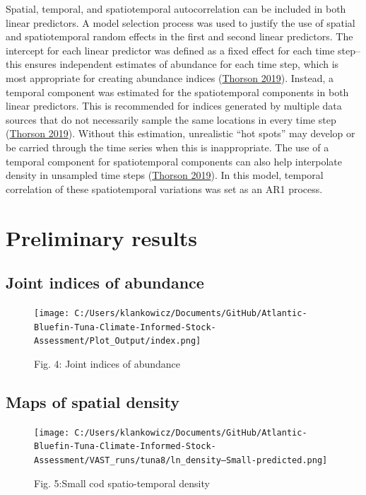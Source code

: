 \documentclass[
]{article}
\begin{document}
Spatial, temporal, and spatiotemporal autocorrelation can be included in both linear predictors. A model selection process was used to justify the use of spatial and spatiotemporal random effects in the first and second linear predictors. The intercept for each linear predictor was defined as a fixed effect for each time step-- this ensures independent estimates of abundance for each time step, which is most appropriate for creating abundance indices (\protect\hyperlink{ref-thorson_2019}{Thorson 2019}). Instead, a temporal component was estimated for the spatiotemporal components in both linear predictors. This is recommended for indices generated by multiple data sources that do not necessarily sample the same locations in every time step (\protect\hyperlink{ref-thorson_2019}{Thorson 2019}). Without this estimation, unrealistic ``hot spots'' may develop or be carried through the time series when this is inappropriate. The use of a temporal component for spatiotemporal components can also help interpolate density in unsampled time steps (\protect\hyperlink{ref-thorson_2019}{Thorson 2019}). In this model, temporal correlation of these spatiotemporal variations was set as an AR1 process.

\hypertarget{preliminary-results}{%
\section{Preliminary results}\label{preliminary-results}}

\hypertarget{joint-indices-of-abundance}{%
\subsection{Joint indices of abundance}\label{joint-indices-of-abundance}}

\begin{figure}
\centering
\texttt{[image: C:/Users/klankowicz/Documents/GitHub/Atlantic-Bluefin-Tuna-Climate-Informed-Stock-Assessment/Plot\_Output/index.png]}
\caption{Fig. 4: Joint indices of abundance}
\end{figure}

\hypertarget{maps-of-spatial-density}{%
\subsection{Maps of spatial density}\label{maps-of-spatial-density}}

\begin{figure}
\centering
\texttt{[image: C:/Users/klankowicz/Documents/GitHub/Atlantic-Bluefin-Tuna-Climate-Informed-Stock-Assessment/VAST\_runs/tuna8/ln\_density--Small-predicted.png]}
\caption{Fig. 5:Small cod spatio-temporal density}
\end{figure}
\end{document}
